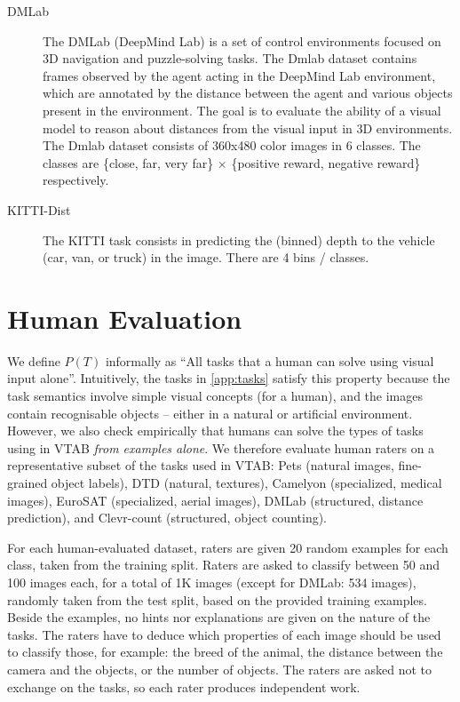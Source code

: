 \documentclass{article}
\def\t{T}
\begin{document}
\begin{description}
    \item[DMLab] \citep{beattie2016deepmind} The DMLab (DeepMind Lab) is a set of control environments focused on 3D navigation and puzzle-solving tasks.
    The Dmlab dataset contains frames observed by the agent acting in the DeepMind Lab environment,
    which are annotated by the distance between the agent and various objects present in the environment.
    The goal is to evaluate the ability of a visual model to reason about distances from the visual input in 3D environments.
    The Dmlab dataset consists of 360x480 color images in 6 classes.
    The classes are \{close, far, very far\} $\times$ \{positive reward, negative reward\} respectively.
    \item[KITTI-Dist] \citep{Geiger2013IJRR} The KITTI task consists in predicting the (binned) depth to the vehicle (car, van, or truck)  in the image. There are 4 bins / classes.
\end{description}

\clearpage
\section{Human Evaluation \label{app:human}}

We define $P(\t)$ informally as ``All tasks that a human can solve using visual input alone''. Intuitively, the tasks in \cref{app:tasks} satisfy this property because the task semantics involve simple visual concepts (for a human), and the images contain recognisable objects -- either in a natural or artificial environment. However, we also check empirically that humans can solve the types of tasks using in VTAB \emph{from examples alone}. We therefore evaluate human raters on a representative subset of the tasks used in VTAB: Pets (natural images, fine-grained object labels), DTD (natural, textures), Camelyon (specialized, medical images), EuroSAT (specialized, aerial images), DMLab (structured, distance prediction), and Clevr-count (structured, object counting). 

For each human-evaluated dataset, raters are given 20 random examples for each class, taken from the training split. Raters are asked to classify between 50 and 100 images each, for a total of 1K images (except for DMLab: 534 images), randomly taken from the test split, based on the provided training examples. Beside the examples, no hints nor explanations are given on the nature of the tasks. The raters have to deduce which properties of each image should be used to classify those, for example: the breed of the animal, the distance between the camera and the objects, or the number of objects. The raters are asked not to exchange on the tasks, so each rater produces independent work. 
\end{document}

